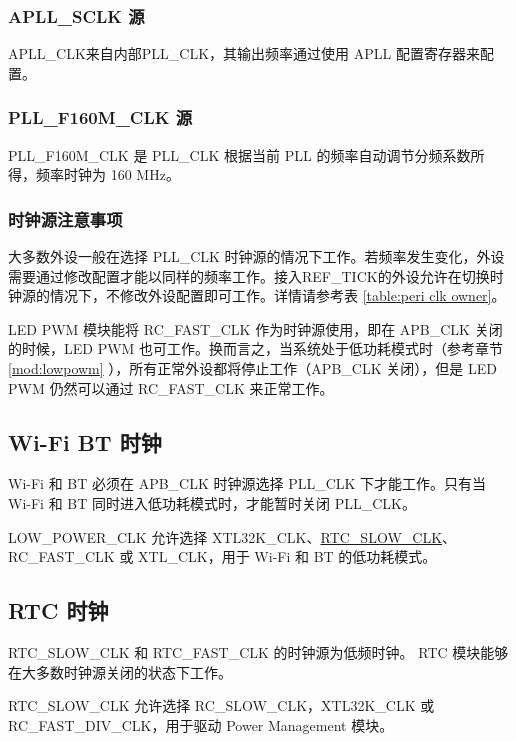 \documentclass[main\_\_CN.tex]{subfiles}
\begin{document}
\subsubsection{APLL\_SCLK 源}

APLL\_CLK来自内部PLL\_CLK，其输出频率通过使用 APLL 配置寄存器来配置。

\subsubsection{PLL\_F160M\_CLK 源}

PLL\_F160M\_CLK 是 PLL\_CLK 根据当前 PLL 的频率自动调节分频系数所得，频率时钟为 160 MHz。


\subsubsection{时钟源注意事项}

大多数外设一般在选择 PLL\_CLK 时钟源的情况下工作。若频率发生变化，外设需要通过修改配置才能以同样的频率工作。接入REF\_TICK的外设允许在切换时钟源的情况下，不修改外设配置即可工作。详情请参考表 \ref{table:peri clk owner}。

LED PWM 模块能将 RC\_FAST\_CLK 作为时钟源使用，即在 APB\_CLK 关闭的时候，LED PWM 也可工作。换而言之，当系统处于低功耗模式时（参考章节 \ref{mod:lowpowm} \textit{}），所有正常外设都将停止工作（APB\_CLK 关闭），但是 LED PWM 仍然可以通过 RC\_FAST\_CLK 来正常工作。



\subsection{Wi-Fi BT 时钟}
Wi-Fi 和 BT 必须在 APB\_CLK 时钟源选择 PLL\_CLK 下才能工作。只有当 Wi-Fi 和 BT 同时进入低功耗模式时，才能暂时关闭 PLL\_CLK。

LOW\_POWER\_CLK 允许选择 XTL32K\_CLK、\hyperlink{SLOW_CLK}{RTC\_SLOW\_CLK}、RC\_FAST\_CLK 或 XTL\_CLK，用于 Wi-Fi  和 BT 的低功耗模式。


\subsection{RTC 时钟}

RTC\_SLOW\_CLK 和 RTC\_FAST\_CLK 的时钟源为低频时钟。 RTC 模块能够在大多数时钟源关闭的状态下工作。


RTC\_SLOW\_CLK 允许选择 RC\_SLOW\_CLK，XTL32K\_CLK 或 RC\_FAST\_DIV\_CLK，用于驱动 Power Management 模块。
\end{document}
